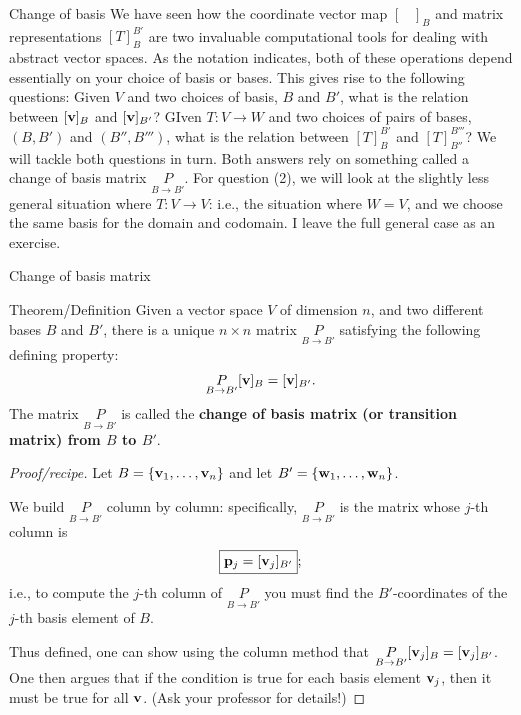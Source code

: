 \begin{frame}{Change of basis}
We have seen how the coordinate vector map $[\hspace{10pt}]_B$ and matrix representations $[T]_B^{B'}$ are two invaluable computational tools for dealing with abstract vector spaces. 
\bpause 
As the notation indicates, both of these operations depend essentially on your \alert{choice of basis or bases}.
This gives rise to the following questions: 
\bb
\ii Given $V$ and two choices of basis, $B$ and $B'$, what is the relation between $[{\mathbf v}]_B$ and $[{\mathbf v}]_{B'}$?
\ii GIven $T\colon V\rightarrow W$ and two choices of pairs of bases, $(B, B')$ and $(B'', B''')$, what is the relation between $[T]_{B}^{B'}$ and $[T]_{B''}^{B'''}$?
\ee
\pause 
We will tackle both questions in turn. Both answers rely on something called a \alert{change of basis matrix} $\underset{B\rightarrow B'}{P}$. 
\bpause
For question (2), we will look at the slightly less general situation where $T\colon V\rightarrow V$: i.e., the situation where $W=V$, and we choose the same basis for the domain and codomain. I leave the full general case as an exercise. 
\end{frame}
\begin{frame}{Change of basis matrix}
\begin{block}{Theorem/Definition} Given a vector space $V$ of dimension $n$, and two different bases $B$ and $B'$, there is a \alert{unique} $n\times n$ matrix $\underset{B\rightarrow B'}{P}$ satisfying the following defining property:
\[
\underset{B\rightarrow B'}{P}[{\mathbf v}]_B=[{\mathbf v}]_{B'}.
\]
The matrix $\underset{B\rightarrow B'}{P}$ is called the {\bf change of basis matrix (or transition matrix) from $B$ to $B'$}. 
\end{block}
\bpause
\begin{proof}[Proof/recipe] Let $B=\{{\mathbf v}_1,\dots, {\mathbf v}_n\}$ and let $B'=\{{\mathbf w}_1,\dots,{\mathbf w}_n\}$. 

We build $\underset{B\rightarrow B'}{P}$ \alert{column by column}: specifically, $\underset{B\rightarrow B'}{P}$ is the matrix whose $j$-th column is  
\[
\boxed{{\mathbf p}_j=[{\mathbf v}_j]_{B'}};
\]
i.e., to compute the $j$-th column of $\underset{B\rightarrow B'}{P}$ you must find the $B'$-coordinates of the $j$-th basis element of $B$.  

\pause Thus defined, one can show using the column method that $\underset{B\rightarrow B'}{P}[{\mathbf v}_j]_{B}=[{\mathbf v}_j]_{B'}$. One then argues that if the condition is true for each basis element ${\mathbf v}_j$, then it must be true for all ${\mathbf v}$. (Ask your professor for details!) 
\end{proof}
\end{frame}
